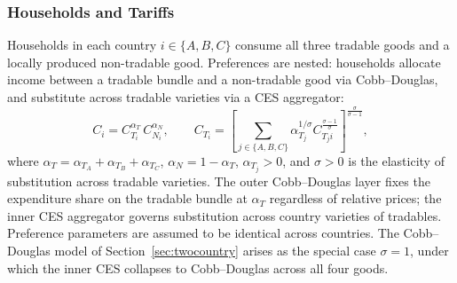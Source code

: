 \documentclass[11pt]{article}
\theoremstyle{plain}
\theoremstyle{remark}
\numberwithin{lemma}{section}
\numberwithin{proposition}{section}
\numberwithin{corollary}{section}
\begin{document}
\subsubsection{Households and Tariffs}

Households in each country $i \in \{A,B,C\}$ consume all three tradable goods and a locally produced non-tradable good. Preferences are nested: households allocate income between a tradable bundle and a non-tradable good via Cobb--Douglas, and substitute across tradable varieties via a CES aggregator:
\[
C_i = C_{T_i}^{\alpha_T}\, C_{N_i}^{\alpha_N}, \qquad C_{T_i} = \left[ \sum_{j \in \{A,B,C\}} \alpha_{T_j}^{1/\sigma} C_{T_j i}^{\frac{\sigma-1}{\sigma}} \right]^{\frac{\sigma}{\sigma-1}},
\]
where $\alpha_T = \alpha_{T_A} + \alpha_{T_B} + \alpha_{T_C}$, $\alpha_N = 1 - \alpha_T$, $\alpha_{T_j} > 0$, and $\sigma > 0$ is the elasticity of substitution across tradable varieties. The outer Cobb--Douglas layer fixes the expenditure share on the tradable bundle at $\alpha_T$ regardless of relative prices; the inner CES aggregator governs substitution across country varieties of tradables. Preference parameters are assumed to be identical across countries. The Cobb--Douglas model of Section~\ref{sec:twocountry} arises as the special case $\sigma = 1$, under which the inner CES collapses to Cobb--Douglas across all four goods.
\end{document}
